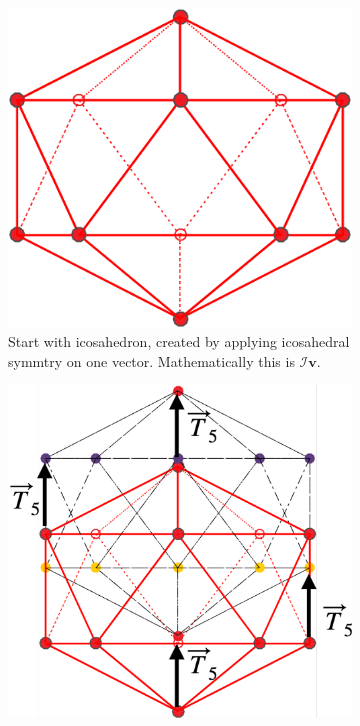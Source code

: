 \documentclass[a4paper,10pt]{article}
\theoremstyle{plain}
\theoremstyle{definition}
\theoremstyle{remark}
\renewcommand{\vec}[1]{\textbf{#1}}
\begin{document}
\begin{figure}[h]
	\centering
	\begin{subfigure}{0.25\textwidth}
		\centering
		\includegraphics[width=\textwidth]{images/p_arr_construction_1.pdf}
		\caption{Start with icosahedron, created by applying icosahedral symmtry on one vector. Mathematically this is \(\mathcal{I}\vec{v}\).}
	\end{subfigure}
	\hfill
	\begin{subfigure}{0.3\textwidth}
		\centering
		\includegraphics[width=\textwidth]{images/p_arr_construction_2.pdf}

\end{subfigure}
\end{figure}
\end{document}
